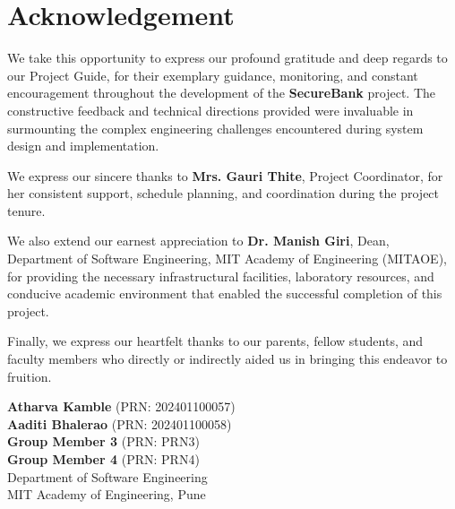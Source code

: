 \chapter*{Acknowledgement}

We take this opportunity to express our profound gratitude and deep regards to our Project Guide, for their exemplary guidance, monitoring, and constant encouragement throughout the development of the \textbf{SecureBank} project. The constructive feedback and technical directions provided were invaluable in surmounting the complex engineering challenges encountered during system design and implementation.

We express our sincere thanks to \textbf{Mrs. Gauri Thite}, Project Coordinator, for her consistent support, schedule planning, and coordination during the project tenure.

We also extend our earnest appreciation to \textbf{Dr. Manish Giri}, Dean, Department of Software Engineering, MIT Academy of Engineering (MITAOE), for providing the necessary infrastructural facilities, laboratory resources, and conducive academic environment that enabled the successful completion of this project.

Finally, we express our heartfelt thanks to our parents, fellow students, and faculty members who directly or indirectly aided us in bringing this endeavor to fruition.

\vspace{1.5cm}
\begin{flushright}
\textbf{Atharva Kamble} (PRN: 202401100057) \\
\textbf{Aaditi Bhalerao} (PRN: 202401100058) \\
\textbf{Group Member 3} (PRN: PRN3) \\
\textbf{Group Member 4} (PRN: PRN4) \\
\vspace{0.3cm}
Department of Software Engineering \\
MIT Academy of Engineering, Pune
\end{flushright}

